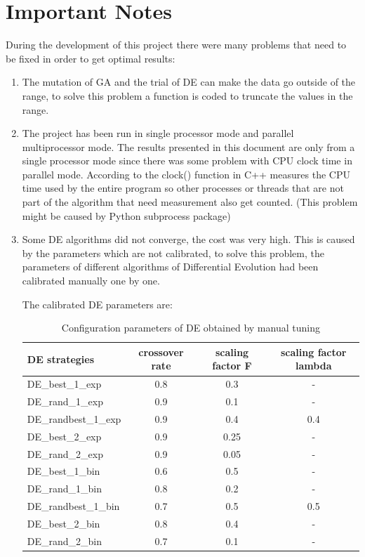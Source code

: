 \documentclass[12pt]{article}
\begin{document}
\section{Important Notes}

During the development of this project there were many problems that need to be fixed in order to get optimal results:

    \begin{enumerate}[label=\arabic*)]
    \item The mutation of GA and the trial of DE can make the data go outside of the range, to solve this problem a function is coded to truncate the values in the range.
    \item The project has been run in single processor mode and parallel multiprocessor mode. The results presented in this document are only from a single processor mode since there was some problem with CPU clock time in parallel mode. According to \cite{clock} the clock() function in C++ measures the CPU time used by the entire program so other processes or threads that are not part of the algorithm that need measurement also get counted. (This problem might be caused by Python subprocess package) 
    \item Some DE algorithms did not converge, the cost was very high. This is caused by the parameters which are not calibrated, to solve this problem, the parameters of different algorithms of Differential Evolution had been calibrated manually one by one.
    
    The calibrated DE parameters are:
\begin{table}[H]    
\centering
\small 
\begin{tabular}{lccc}

\hline
DE strategies & crossover rate& scaling factor F& scaling factor lambda\\
\hline 
DE\_best\_1\_exp & 0.8 &    0.3&    - \\
DE\_rand\_1\_exp& 0.9&    0.1&    - \\
DE\_randbest\_1\_exp& 0.9&    0.4&    0.4 \\
DE\_best\_2\_exp& 0.9&    0.25&    - \\
DE\_rand\_2\_exp& 0.9&    0.05&    - \\
DE\_best\_1\_bin& 0.6&    0.5&    - \\
DE\_rand\_1\_bin& 0.8&    0.2&    - \\
DE\_randbest\_1\_bin& 0.7&    0.5&    0.5\\
DE\_best\_2\_bin& 0.8&    0.4&    - \\
DE\_rand\_2\_bin& 0.7&    0.1&    - \\
\hline 
\end{tabular} 
\caption{Configuration parameters of DE obtained by manual tuning} 
\end{table}




\end{enumerate}
\end{document}
